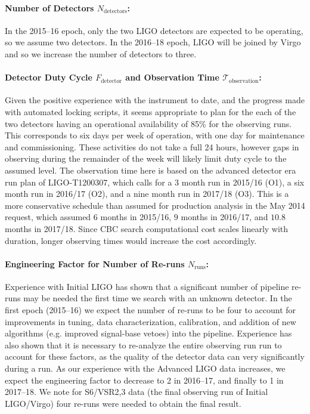 \vspace*{-15pt}
\paragraph{Number of Detectors $N_\textrm{detectors}$:}
In the 2015--16 epoch, only the two
LIGO detectors are expected to be operating, so we assume two detectors. In
the 2016--18 epoch, LIGO will be joined by Virgo and so we increase the number
of detectors to three.

\vspace*{-15pt}
\paragraph{Detector Duty Cycle $F_\textrm{detector}$ and Observation Time
$\mathcal{T}_\textrm{observation}$:} Given the positive experience with the
instrument to date, and the progress made with automated locking scripts, it
seems appropriate to plan for the each of the two detectors having an
operational availability of 85\% for the observing runs. This corresponds to
six days per week of operation, with one day for maintenance and
commissioning. These activities do not take a full 24 hours, however gaps in
observing during the remainder of the week will likely limit duty cycle to the
assumed level. The observation time here is based on the advanced detector era
run plan of LIGO-T1200307, which calls for a 3 month run in 2015/16 (O1), a six month run in
2016/17 (O2), and a nine month run in 2017/18 (O3). This is a more
conservative schedule than assumed for production analysis in the May 2014
request, which assumed $6$ months in 2015/16, $9$ months in 2016/17, and
$10.8$ months in 2017/18. Since CBC search computational cost scales linearly
with duration, longer observing times would increase the cost accordingly.

\vspace*{-15pt}
\paragraph{Engineering Factor for Number of Re-runs $N_\textrm{runs}$:}
Experience with Initial LIGO
has shown that a significant number of pipeline re-runs may be needed the first
time we search with an unknown detector. In the first epoch (2015--16) we
expect the number of re-runs to be four to account for improvements in tuning,
data characterization, calibration, and addition of new algorithms (e.g.
improved signal-base vetoes) into the pipeline. Experience has also shown that
it is necessary to re-analyze the entire observing run run to account for these factors,
as the quality of the detector data can very significantly during a run. As
our experience with the Advanced LIGO data increases, we expect the
engineering factor to decrease to 2 in 2016--17, and finally to 1 in 2017--18.
We note for S6/VSR2,3 data (the final observing run of Initial LIGO/Virgo) four
re-runs were needed to obtain the final result.


